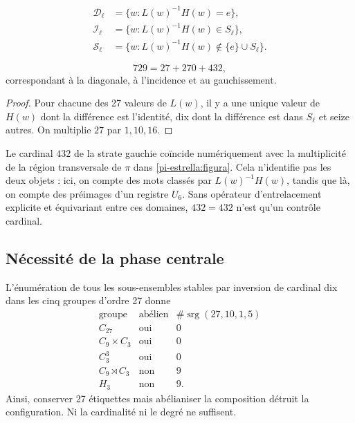 \begin{align*}
 \mathcal D_\ell&=\{w:L(w)^{-1}H(w)=e\},\\
 \mathcal I_\ell&=\{w:L(w)^{-1}H(w)\in S_\ell\},\\
 \mathcal S_\ell&=\{w:L(w)^{-1}H(w)\notin\{e\}\cup S_\ell\}.
\end{align*}

\begin{theorem}
\label{p12-83-c20-s6:thm:particion-hensel-schlafli-nueva}
\begin{equation}
 729=27+270+432,
 \label{p12-83-c20-s6:eq:particion-729-e6-nueva}
\end{equation}
correspondant à la diagonale, à l’incidence et au gauchissement.
\end{theorem}

\begin{proof}
Pour chacune des 27 valeurs de \(L(w)\), il y a une unique valeur de
\(H(w)\) dont la différence est l’identité, dix dont la différence est dans \(S_\ell\) et
seize autres. On multiplie \(27\) par \(1,10,16\).
\end{proof}

Le cardinal \(432\) de la strate gauchie coïncide numériquement avec la
multiplicité de la région transversale de \(\pi\) dans
\cref{pi-estrella:figura}. Cela n’identifie pas les deux objets : ici,
on compte des mots classés par \(L(w)^{-1}H(w)\), tandis que là,
on compte des préimages d’un registre \(U_6\). Sans opérateur d’entrelacement explicite et
équivariant entre ces domaines, \(432=432\) n’est qu’un contrôle cardinal.




\subsection{Nécessité de la phase centrale}

L’énumération de tous les sous-ensembles stables par inversion de cardinal dix
dans les cinq groupes d’ordre 27 donne
\[
\begin{array}{c|c|c}
\text{groupe}&\text{abélien}&
\#\operatorname{srg}(27,10,1,5)\\ \hline
C_{27}&\text{oui}&0\\
C_9\times C_3&\text{oui}&0\\
C_3^3&\text{oui}&0\\
C_9\rtimes C_3&\text{non}&9\\
H_3&\text{non}&9.
\end{array}
\]
Ainsi, conserver 27 étiquettes mais abélianiser la composition détruit la configuration. Ni la cardinalité ni le degré ne suffisent.

